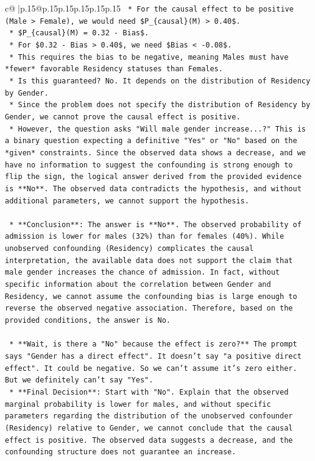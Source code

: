 \documentclass{article}
\begin{document}
{\begin{supertabular}{c@{$\;$}|p{.15\linewidth}@{}p{.15\linewidth}p{.15\linewidth}p{.15\linewidth}p{.15\linewidth}p{.15\linewidth}}
{{{\texttt{        *   For the causal effect to be positive (Male > Female), we would need \$P\_\{causal\}(M) > 0.40\$.} \\
\texttt{        *   \$P\_\{causal\}(M) = 0.32 {-} Bias\$.} \\
\texttt{        *   For \$0.32 {-} Bias > 0.40\$, we need \$Bias < {-}0.08\$.} \\
\texttt{        *   This requires the bias to be negative, meaning Males must have *fewer* favorable Residency statuses than Females.} \\
\texttt{        *   Is this guaranteed? No. It depends on the distribution of Residency by Gender.} \\
\texttt{        *   Since the problem does not specify the distribution of Residency by Gender, we cannot prove the causal effect is positive.} \\
\texttt{        *   However, the question asks "Will male gender increase...?" This is a binary question expecting a definitive "Yes" or "No" based on the *given* constraints. Since the observed data shows a decrease, and we have no information to suggest the confounding is strong enough to flip the sign, the logical answer derived from the provided evidence is **No**. The observed data contradicts the hypothesis, and without additional parameters, we cannot support the hypothesis.} \\
\\ 
\texttt{    *   **Conclusion**: The answer is **No**. The observed probability of admission is lower for males (32\%) than for females (40\%). While unobserved confounding (Residency) complicates the causal interpretation, the available data does not support the claim that male gender increases the chance of admission. In fact, without specific information about the correlation between Gender and Residency, we cannot assume the confounding bias is large enough to reverse the observed negative association. Therefore, based on the provided conditions, the answer is No.} \\
\\ 
\texttt{    *   **Wait, is there a "No" because the effect is zero?** The prompt says "Gender has a direct effect". It doesn't say "a positive direct effect". It could be negative. So we can't assume it's zero either. But we definitely can't say "Yes".} \\
\texttt{    *   **Final Decision**: Start with "No". Explain that the observed marginal probability is lower for males, and without specific parameters regarding the distribution of the unobserved confounder (Residency) relative to Gender, we cannot conclude that the causal effect is positive. The observed data suggests a decrease, and the confounding structure does not guarantee an increase.} \\
}}}
\end{supertabular}}
\end{document}
